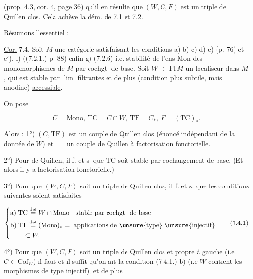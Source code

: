 
(prop. 4.3, cor. 4, page 36) qu'il en résulte que $(W,C,F)$ est un triple de Quillen clos. Cela achève la dém. de 7.1 et 7.2.

Résumons l'essentiel :


\uline{Cor.} 7.4. Soit $M$ une catégorie satisfaisant les conditions a) b) c) d) e) (p. 76) et e$'$), f) ((7.2.1.) p. 88) enfin g) (7.2.6) i.e. stabilité de l'ens $\mathrm{Mon}$ des monomorphismes de $M$ par cochgt. de base. Soit $W$  $\subset\mathrm{Fl}\,M$ un localiseur dans $M$, qui est \uline{stable par} \uline{$\lim$} \uline{filtrantes} et de plus (condition plus subtile, mais  anodine) \uline{accessible}.

On pose

\[
C=\mathrm{Mono},\ \mathrm{TC}=C\cap W,\ \mathrm{TF}=C_*,\ F=(\mathrm{TC})_*.
\]

Alors : 1°) $(C,\mathrm{TF})$ est un couple de Quillen clos (énoncé indépendant de la donnée de $W$) et $=$ un couple de Quillen à factorisation fonctorielle.


2°) Pour   de Quillen, il f. et s. que $\mathrm{TC}$ soit stable par cochangement de base. (Et alors il y a factorisation fonctorielle.)

3°) Pour que $(W,C,F)$ soit un triple de Quillen clos, il f. et s. que les conditions suivantes soient satisfaites

\[
\left\{\begin{aligned}
&\text{a) }\mathrm{TC}\overset{\mathrm{def}}{=}W\cap\mathrm{Mono}\quad\text{stable par cochgt. de base}\\
&\text{b) }\mathrm{TF}\overset{\mathrm{def}}{=}(\mathrm{Mono})_*=\text{ applications de \unsure{type} \unsure{injectif}}\\
&\qquad\subset W.
\end{aligned}\right.\tag*{(7.4.1)}
\]


4°) Pour que $(W,C,F)$ soit un triple de Quillen clos et propre à gauche (i.e. $C\subset\mathrm{Cof}_W$) il faut et il suffit qu'on ait la condition (7.4.1.) b) (i.e $W$ contient les morphismes de type injectif), et de plus

